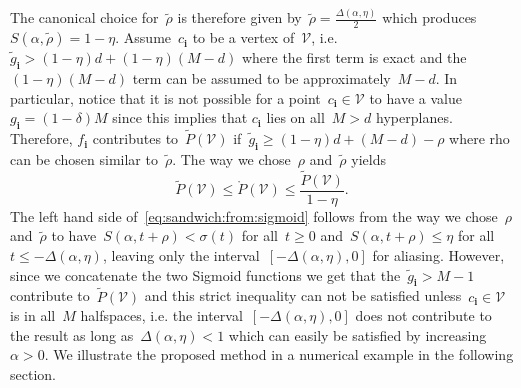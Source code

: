\documentclass[letterpaper, 10pt, conference]{ieeeconf} %
\providecommand{\bfa}[1]{\mathbf{#1}}
\begin{document}
%
The canonical choice for~$\tilde\rho$ is therefore given by~$\tilde\rho=\frac{\Delta(\alpha,\eta)}{2}$ which produces~$S(\alpha,\tilde\rho)=1-\eta$.
%
Assume~$c_\bfa{i}$ to be a vertex of~$\mathcal V$, i.e.~$\tilde g_\bfa{i}>(1-\eta)d+(1-\eta)(M-d)$ where the first term is exact and the~$(1-\eta)(M-d)$ term can be assumed to be approximately~$M-d$.
%
In particular, notice that it is not possible for a point~$c_\bfa{i}\in\mathcal V$ to have a value~$g_\bfa{i}=(1-\delta)M$ since this implies that $c_\bfa{i}$ lies on all~$M>d$ hyperplanes.
%
Therefore, $f_\bfa{i}$ contributes to~$\tilde{P}(\mathcal V)$ if~$\tilde g_\bfa{i}\geq(1-\eta)d+(M-d)-\rho$ where rho can be chosen similar to~$\tilde\rho$.
%
The way we chose~$\rho$ and~$\tilde\rho$ yields
%
\begin{equation}\label{eq:sandwich:from:sigmoid}
	\tilde P(\mathcal V)\leq\mathring P(\mathcal V)\leq \frac{\tilde P(\mathcal V)}{1-\eta}.
\end{equation}
%
The left hand side of~\eqref{eq:sandwich:from:sigmoid} follows from the way we chose~$\rho$ and~$\tilde\rho$ to have~$S(\alpha,t+\rho)<\sigma(t)$ for all~$t\geq0$ and~$S(\alpha,t+\rho)\leq\eta$ for all~$t\leq -\Delta(\alpha,\eta)$, leaving only the interval~$[-\Delta(\alpha,\eta),0]$ for aliasing.
%
However, since we concatenate the two Sigmoid functions we get that the~$\tilde g_\bfa{i}>M-1$ contribute to~$\tilde P(\mathcal V)$ and this strict inequality can not be satisfied unless~$c_\bfa{i}\in\mathcal V$ is in all~$M$ halfspaces, i.e. the interval~$[-\Delta(\alpha,\eta),0]$ does not contribute to the result as long as~$\Delta(\alpha,\eta)<1$ which can easily be satisfied by increasing~$\alpha>0$.
%
We illustrate the proposed method in a numerical example in the following section.
\end{document}
